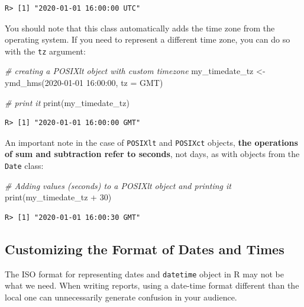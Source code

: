 \documentclass[
  12pt,
]{book}
\newenvironment{Shaded}{\begin{snugshade}}{\end{snugshade}}
\newcommand{\AttributeTok}[1]{\textcolor[rgb]{0.61,0.61,0.61}{#1}}
\newcommand{\CommentTok}[1]{\textcolor[rgb]{0.37,0.37,0.37}{\textit{#1}}}
\newcommand{\DecValTok}[1]{\textcolor[rgb]{0.06,0.06,0.06}{#1}}
\newcommand{\FunctionTok}[1]{\textcolor[rgb]{0,0,0}{#1}}
\newcommand{\NormalTok}[1]{#1}
\newcommand{\OtherTok}[1]{\textcolor[rgb]{0.37,0.37,0.37}{#1}}
\newcommand{\SpecialCharTok}[1]{\textcolor[rgb]{0,0,0}{#1}}
\newcommand{\StringTok}[1]{\textcolor[rgb]{0.5,0.5,0.5}{#1}}
\begin{document}
\begin{verbatim}
R> [1] "2020-01-01 16:00:00 UTC"
\end{verbatim}

You should note that this class automatically adds the time zone from the operating system. If you need to represent a different time zone, you can do so with the \texttt{tz} argument:

\begin{Shaded}
\begin{Highlighting}[]
\CommentTok{\# creating a POSIXlt object with custom timezone}
\NormalTok{my\_timedate\_tz }\OtherTok{\textless{}{-}} \FunctionTok{ymd\_hms}\NormalTok{(}\StringTok{\textquotesingle{}2020{-}01{-}01 16:00:00\textquotesingle{}}\NormalTok{,}
                          \AttributeTok{tz =} \StringTok{\textquotesingle{}GMT\textquotesingle{}}\NormalTok{)}

\CommentTok{\# print it}
\FunctionTok{print}\NormalTok{(my\_timedate\_tz)}
\end{Highlighting}
\end{Shaded}

\begin{verbatim}
R> [1] "2020-01-01 16:00:00 GMT"
\end{verbatim}

An important note in the case of \texttt{POSIXlt} and \texttt{POSIXct} objects, \textbf{the operations of sum and subtraction refer to seconds}, not days, as with objects from the \texttt{Date} class:

\begin{Shaded}
\begin{Highlighting}[]
\CommentTok{\# Adding values (seconds) to a POSIXlt object and printing it}
\FunctionTok{print}\NormalTok{(my\_timedate\_tz }\SpecialCharTok{+} \DecValTok{30}\NormalTok{)}
\end{Highlighting}
\end{Shaded}

\begin{verbatim}
R> [1] "2020-01-01 16:00:30 GMT"
\end{verbatim}

\hypertarget{customizing-the-format-of-dates-and-times}{%
\subsection{Customizing the Format of Dates and Times}\label{customizing-the-format-of-dates-and-times}}

The ISO format for representing dates and \texttt{datetime} object in R may not be what we need. When writing reports, using a date-time format different than the local one can unnecessarily generate confusion in your audience.
\end{document}
